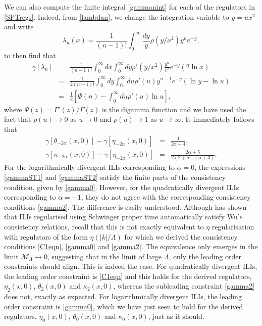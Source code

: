 \documentclass[12pt, letter]{article}
\def\be{\begin{equation}}
\def\ee{\end{equation}}
\newcommand{\M}{\mathcal{M}}
\begin{document}
We can also compute the finite integral \eqref{gammanint} for each of the regulators  in \eqref{SPTregs}.  Indeed, from \eqref{lambdan}, we change the integration variable to $y=ux^2$ and write 
\be
\lambda_n(x)=\frac{1}{(n-1)!}\int_0^\infty \frac{dy}{y}  \rho(y/x^2)  y^{n} e^{-y},
\ee
to  then find that 
\begin{eqnarray}
\gamma[\lambda_n]&=&\frac{1}{(n-1)!}  \int_0^\infty  dx \int_0^\infty dy   \rho'(y/x^2)  \frac{y^{n}}{x^3} e^{-y} (2 \ln x) \\
&=& \frac{1}{2(n-1)!}     \int_0^\infty dy  \int_0^\infty  du   \rho'(u)  y^{n-1} e^{-y} ( \ln y-\ln u)  \\
& =& \frac{1}{2} \left[\Psi(n) - \int_0^\infty du \rho'(u) \ln u \right], 
\end{eqnarray}
where $\Psi(z)=\Gamma'(z)/\Gamma(z)$ is the digamma function and we have used the fact that  $\rho(u) \to 0$  as $u\to 0$ and $\rho(u) \to 1$ as $u \to \infty$. It immediately follows that 
\begin{eqnarray}
\gamma[\theta_{-2\alpha}(x, 0)]-\gamma[\eta_{-2\alpha}(x, 0)]&=&\frac{1}{2\alpha+4} \label{gammaST1},\\
\gamma[\kappa_{-2\alpha}(x, 0)]-\gamma[\eta_{-2\alpha}(x, 0)]&=&\frac{2 \alpha +5}{2 \left(2+\alpha \right) \left(\alpha +3\right)}. \label{gammaST2}
\end{eqnarray}
For the logarithmically divergent ILIs corresponding to $\alpha=0$, the expressions \eqref{gammaST1} and \eqref{gammaST2} satisfy the finite parts of the consistency condition, given by  \eqref{gamma0}. However, for the quadratically divergent ILIs corresponding to $\alpha=-1$, they do not agree with the corresponding consistency conditions \eqref{gamma2}. The difference is easily understood.  Although \cite{Xing:2022jtt}  has shown that  ILIs regularised using Schwinger proper time automatically satisfy Wu's consistency relations, recall that this is not exactly equivalent to $\eta$ regularisation with regulators of the form $\eta(|k|/\Lambda)$ for which we derived the consistency conditions \eqref{C1eqn},  \eqref{gamma0} and \eqref{gamma2}. The equivalence only emerges in the limit $\M_\Lambda \to 0$, suggesting that in the limit of large $\Lambda$, only the leading order constraints should align. This is indeed the case. For quadratically divergent ILIs, the leading order constraint is \eqref{C1eqn} and this holds for the derived regulators, $\eta_{2}(x, 0)$, $\theta_{2}(x, 0)$ and $\kappa_{2}(x, 0)$, whereas the subleading constraint \eqref{gamma2} does not, exactly as expected.  For logarithmically divergent ILIs,  the leading order constraint is \eqref{gamma0}, which  we have just seen to hold for the derived regulators, $\eta_{0}(x, 0)$, $\theta_{0}(x, 0)$ and $\kappa_{0}(x, 0)$, just as it should. 
\end{document}

